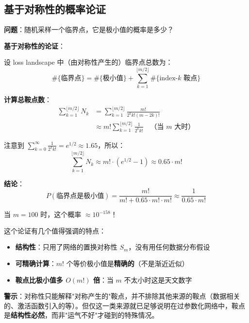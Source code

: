 \documentclass[12pt, a4paper]{ctexart}
\begin{document}
\subsection{基于对称性的概率论证}

\begin{blackboard}[从计数到概率]

\textbf{问题}：随机采样一个临界点，它是极小值的概率是多少？

\textbf{基于对称性的论证}：

设 loss landscape 中（由对称性产生的）临界点总数为：
\[
\#\{\text{临界点}\} = \#\{\text{极小值}\} + \sum_{k=1}^{\lfloor m/2 \rfloor} \#\{\text{index-}k \text{ 鞍点}\}
\]

\textbf{计算总鞍点数}：
\begin{align*}
\sum_{k=1}^{\lfloor m/2 \rfloor} N_k &= \sum_{k=1}^{\lfloor m/2 \rfloor} \frac{m!}{2^k k! (m-2k)!} \\
&\approx m! \sum_{k=1}^{\lfloor m/2 \rfloor} \frac{1}{2^k k!} \quad \text{（当 $m$ 大时）}
\end{align*}

注意到 $\sum_{k=0}^{\infty} \frac{1}{2^k k!} = e^{1/2} \approx 1.65$，所以：
\[
\sum_{k=1}^{\lfloor m/2 \rfloor} N_k \approx m! \cdot (e^{1/2} - 1) \approx 0.65 \cdot m!
\]

\textbf{结论}：
\[
P(\text{临界点是极小值}) = \frac{m!}{m! + 0.65 \cdot m! \cdot m!} \approx \frac{1}{0.65 \cdot m!}
\]

当 $m = 100$ 时，这个概率 $\approx 10^{-158}$！

\end{blackboard}

\begin{insight}[对称性论证的力量]
这个论证有几个值得强调的特点：

\begin{itemize}
    \item \textbf{结构性}：只用了网络的置换对称性 $S_m$，没有用任何数据分布假设
    \item \textbf{可精确计算}：$m!$ 个等价极小值是\textbf{精确的}（不是渐近近似）
    \item \textbf{鞍点比极小值多 $O(m!)$ 倍}：当 $m$ 不太小时这是天文数字
\end{itemize}

\textbf{警示}：对称性只能解释"对称产生的"鞍点，并不排除其他来源的鞍点（数据相关的、激活函数引入的等）。但仅这一类来源就已足够说明在过参数化网络中，鞍点是\textbf{结构性必然}，而非"运气不好"才碰到的特殊情况。
\end{insight}
\end{document}
